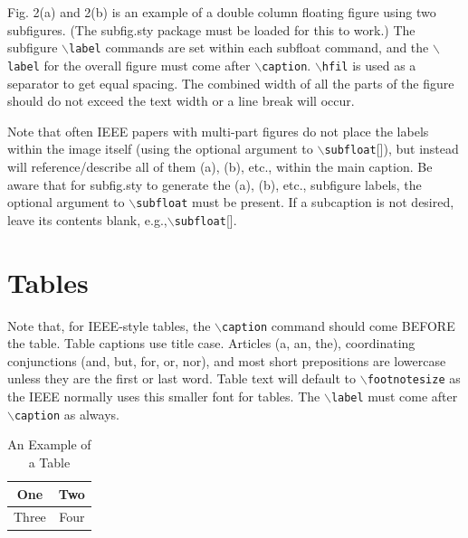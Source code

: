 \documentclass[lettersize,journal]{IEEEtran}
\begin{document}

Fig. 2(a) and 2(b) is an example of a double column floating figure using two subfigures.
 (The subfig.sty package must be loaded for this to work.)
 The subfigure $\backslash${\tt{label}} commands are set within each subfloat command,
 and the $\backslash${\tt{label}} for the overall figure must come after $\backslash${\tt{caption}}.
 $\backslash${\tt{hfil}} is used as a separator to get equal spacing.
 The combined width of all the parts of the figure should do not exceed the text width or a line break will occur.
%

Note that often IEEE papers with multi-part figures do not place the labels within the image itself (using the optional argument to $\backslash${\tt{subfloat}}[]), but instead will
 reference/describe all of them (a), (b), etc., within the main caption.
 Be aware that for subfig.sty to generate the (a), (b), etc., subfigure
 labels, the optional argument to $\backslash${\tt{subfloat}} must be present. If a
 subcaption is not desired, leave its contents blank,
 e.g.,$\backslash${\tt{subfloat}}[].


 

\section{Tables}
Note that, for IEEE-style tables, the
 $\backslash${\tt{caption}} command should come BEFORE the table. Table captions use title case. Articles (a, an, the), coordinating conjunctions (and, but, for, or, nor), and most short prepositions are lowercase unless they are the first or last word. Table text will default to $\backslash${\tt{footnotesize}} as
 the IEEE normally uses this smaller font for tables.
 The $\backslash${\tt{label}} must come after $\backslash${\tt{caption}} as always.
 
\begin{table}[!t]
\caption{An Example of a Table\label{tab:table1}}
\centering
\begin{tabular}{|c||c|}
\hline
One & Two\\
\hline
Three & Four\\
\hline
\end{tabular}
\end{table}
\end{document}
